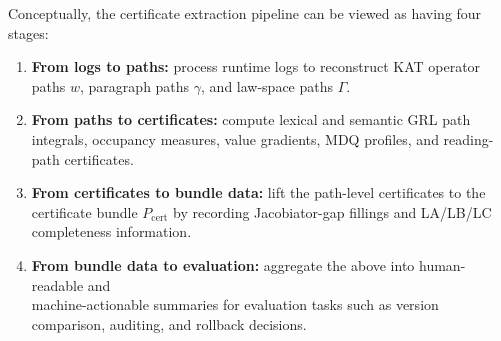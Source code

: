 \documentclass[11pt]{book}
\theoremstyle{plain}
\theoremstyle{definition}
\theoremstyle{remark}
\begin{document}
Conceptually, the certificate extraction pipeline can be viewed as
having four stages:
\begin{enumerate}
  \item \textbf{From logs to paths:} process runtime logs to reconstruct
        KAT operator paths $w$, paragraph paths $\gamma$, and law-space
        paths $\Gamma$.
  \item \textbf{From paths to certificates:} compute lexical and
        semantic GRL path integrals, occupancy measures, value
        gradients, MDQ profiles, and reading-path certificates.
  \item \textbf{From certificates to bundle data:} lift the path-level
        certificates to the certificate bundle $P_{\mathrm{cert}}$ by
        recording Jacobiator-gap fillings and LA/LB/LC completeness
        information.
  \item \textbf{From bundle data to evaluation:} aggregate the above
        into human-readable and \\machine-actionable summaries for
        evaluation tasks such as version comparison, auditing, and
        rollback decisions.
\end{enumerate}
\end{document}
